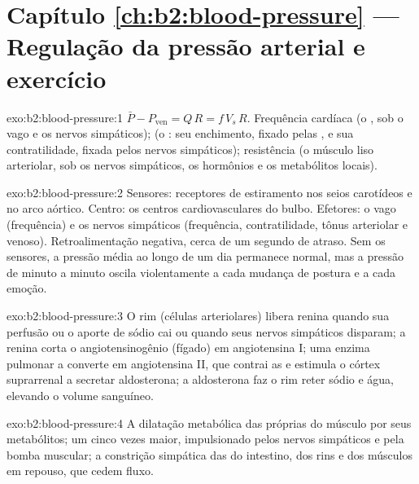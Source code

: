 \section*{Capítulo \ref{ch:b2:blood-pressure} --- Regulação da pressão arterial e exercício}

\begin{solution}{exo:b2:blood-pressure:1}
$\bar P - P_{\text{ven}} = Q\,R = f\,V_s\,R$. Frequência cardíaca (o , sob o vago e os nervos simpáticos);  (o
: seu enchimento, fixado pelas , e sua contratilidade,
fixada pelos nervos simpáticos); resistência (o músculo liso
arteriolar, sob os nervos simpáticos, os hormônios e os metabólitos
locais).
\end{solution}

\begin{solution}{exo:b2:blood-pressure:2}
Sensores: receptores de estiramento nos seios carotídeos e no arco
aórtico. Centro: os centros cardiovasculares do bulbo. Efetores: o vago
(frequência) e os nervos simpáticos (frequência, contratilidade, tônus
arteriolar e venoso). Retroalimentação negativa, cerca de um segundo de
atraso. Sem os sensores, a pressão média ao longo de um dia permanece
normal, mas a pressão de minuto a minuto oscila violentamente a cada
mudança de postura e a cada emoção.
\end{solution}

\begin{solution}{exo:b2:blood-pressure:3}
O rim (células arteriolares) libera renina quando sua perfusão ou o
aporte de sódio cai ou quando seus nervos simpáticos disparam; a renina
corta o angiotensinogênio (fígado) em angiotensina I; uma enzima
pulmonar a converte em angiotensina II, que contrai as  e
estimula o córtex suprarrenal a secretar aldosterona; a aldosterona faz
o rim reter sódio e água, elevando o volume sanguíneo.
\end{solution}

\begin{solution}{exo:b2:blood-pressure:4}
A dilatação metabólica das próprias  do músculo por seus
metabólitos; um  cinco vezes maior, impulsionado pelos
nervos simpáticos e pela bomba muscular; a constrição simpática das
 do intestino, dos rins e dos músculos em repouso, que cedem
fluxo.
\end{solution}

